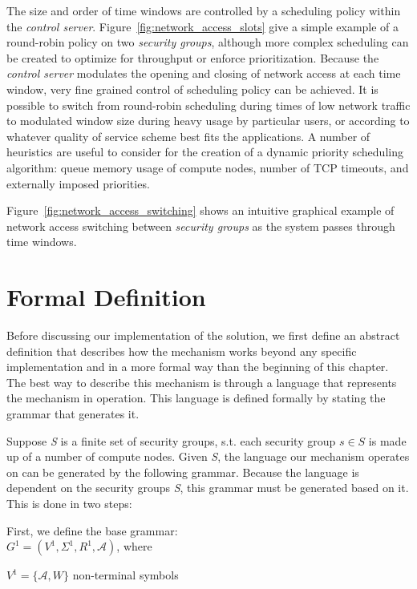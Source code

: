 \documentclass[oneside,12pt]{memoir}
\newcommand{\tab}{\hspace*{2em}}
\begin{document}
The size and order of time windows are controlled by a scheduling policy within the \textit{control server}. Figure~\ref{fig:network_access_slots} give a simple example of a round-robin policy on two \textit{security groups}, although more complex scheduling can be created to optimize for throughput or enforce prioritization. Because the \textit{control server} modulates the opening and closing of network access at each time window, very fine grained control of scheduling policy can be achieved. It is possible to switch from round-robin scheduling during times of low network traffic to modulated window size during heavy usage by particular users, or according to whatever quality of service scheme best fits the applications. A number of heuristics are useful to consider for the creation of a dynamic priority scheduling algorithm: queue memory usage of compute nodes, number of TCP timeouts, and externally imposed priorities. 

Figure~\ref{fig:network_access_switching} shows an intuitive graphical example of network access switching between \textit{security groups} as the system passes through time windows.

\section{Formal Definition}
\label{sec:formal_definition}
Before discussing our implementation of the solution, we first define an abstract definition that describes how the mechanism works beyond any specific implementation and in a more formal way than the beginning of this chapter. The best way to describe this mechanism is through a language that represents the mechanism in operation. This language is defined formally by stating the grammar that generates it.

Suppose \emph{S} is a finite set of security groups, s.t. each security group $s\in S$ is made up of a number of compute nodes. Given \emph{S}, the language our mechanism operates on can be generated by the following grammar. Because the language is dependent on the security groups \emph{S}, this grammar must be generated based on it. This is done in two steps:

First, we define the base grammar:\\

\tab $G^1 = (V^1, \Sigma^1, R^1, \mathcal{A})$, where

\tab $V^1 = \{\mathcal{A} , W\}$ \hfill non-terminal symbols \hspace*{6em}
\end{document}
